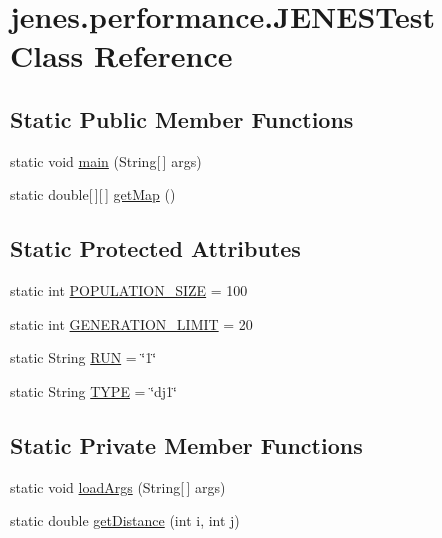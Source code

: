\hypertarget{classjenes_1_1performance_1_1_j_e_n_e_s_test}{\section{jenes.\-performance.\-J\-E\-N\-E\-S\-Test Class Reference}
\label{classjenes_1_1performance_1_1_j_e_n_e_s_test}
}
\subsection*{Static Public Member Functions}
\begin{DoxyCompactItemize}
\item 
static void \hyperlink{classjenes_1_1performance_1_1_j_e_n_e_s_test_afc2ae43a51b06536b61ff8c256d1a4b5}{main} (String\mbox{[}$\,$\mbox{]} args)
\item 
static double\mbox{[}$\,$\mbox{]}\mbox{[}$\,$\mbox{]} \hyperlink{classjenes_1_1performance_1_1_j_e_n_e_s_test_a7a02a502f510836006a2110099982511}{get\-Map} ()
\end{DoxyCompactItemize}
\subsection*{Static Protected Attributes}
\begin{DoxyCompactItemize}
\item 
static int \hyperlink{classjenes_1_1performance_1_1_j_e_n_e_s_test_abd366eca37794a675c7db2c210b71176}{P\-O\-P\-U\-L\-A\-T\-I\-O\-N\-\_\-\-S\-I\-Z\-E} = 100
\item 
static int \hyperlink{classjenes_1_1performance_1_1_j_e_n_e_s_test_ab2a38cace613491b31f31dcf06b8bf5a}{G\-E\-N\-E\-R\-A\-T\-I\-O\-N\-\_\-\-L\-I\-M\-I\-T} = 20
\item 
static String \hyperlink{classjenes_1_1performance_1_1_j_e_n_e_s_test_a5c84bd75d825c995f6bebb79b45df6c1}{R\-U\-N} = \char`\"{}1\char`\"{}
\item 
static String \hyperlink{classjenes_1_1performance_1_1_j_e_n_e_s_test_a6b35bbf22096ec3923e78d2bc407c2f4}{T\-Y\-P\-E} = \char`\"{}dj1\char`\"{}
\end{DoxyCompactItemize}
\subsection*{Static Private Member Functions}
\begin{DoxyCompactItemize}
\item 
static void \hyperlink{classjenes_1_1performance_1_1_j_e_n_e_s_test_a6ee8abdb1d94973d60fb0161083da9a4}{load\-Args} (String\mbox{[}$\,$\mbox{]} args)
\item 
static double \hyperlink{classjenes_1_1performance_1_1_j_e_n_e_s_test_a6dcd1bd9881f9b175cb527d14683d841}{get\-Distance} (int i, int j)
\end{DoxyCompactItemize}
